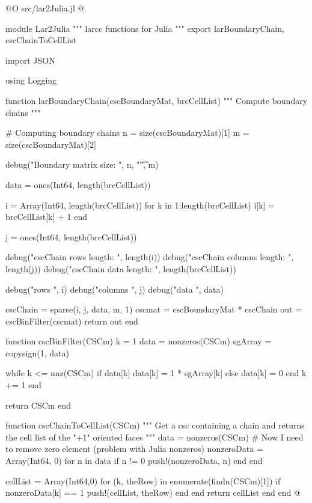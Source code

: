 \documentclass[11pt,oneside]{article}	%
\begin{document}
@O src/lar2Julia.jl
@{module Lar2Julia
"""
larcc functions for Julia
"""
export larBoundaryChain, cscChainToCellList

import JSON

using Logging

function larBoundaryChain(cscBoundaryMat, brcCellList)
  """
  Compute boundary chains
  """

  # Computing boundary chains
  n = size(cscBoundaryMat)[1]
  m = size(cscBoundaryMat)[2]

  debug("Boundary matrix size: ", n, "\t", m)

  data = ones(Int64, length(brcCellList))

  i = Array(Int64, length(brcCellList))
  for k in 1:length(brcCellList)
    i[k] = brcCellList[k] + 1
  end

  j = ones(Int64, length(brcCellList))

  debug("cscChain rows length: ", length(i))
  debug("cscChain columns length: ", length(j))
  debug("cscChain data length: ", length(brcCellList))

  debug("rows ", i)
  debug("columns ", j)
  debug("data ", data)

  cscChain = sparse(i, j, data, m, 1)
  cscmat = cscBoundaryMat * cscChain
  out = cscBinFilter(cscmat)
  return out
end

function cscBinFilter(CSCm)
  k = 1
  data = nonzeros(CSCm)
  sgArray = copysign(1, data)

  while k <= nnz(CSCm)
    if data[k] %
      data[k] = 1 * sgArray[k]
    else
      data[k] = 0
    end
    k += 1
  end

  return CSCm
end

function cscChainToCellList(CSCm)
  """
  Get a csc containing a chain and returns
  the cell list of the "+1" oriented faces
  """
  data = nonzeros(CSCm)
  # Now I need to remove zero element (problem with Julia nonzeros)
  nonzeroData = Array(Int64, 0)
  for n in data
    if n != 0
      push!(nonzeroData, n)
    end
  end

  cellList = Array(Int64,0)
  for (k, theRow) in enumerate(findn(CSCm)[1])
    if nonzeroData[k] == 1
      push!(cellList, theRow)
    end
  end
  return cellList
end
end
@}
\end{document}
